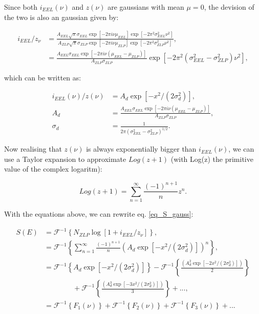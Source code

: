 Since both $i_{EEL}(\nu)$ and $z(\nu)$ are gaussians with mean $\mu = 0$, the devision of the two is also an gaussian given by:

\begin{equation}
\begin{aligned}
i_{EEL}/z_{\nu} &= \frac{A_{EEL} \sqrt{\pi}\sigma_{EEL} \exp{\left[-2 \pi i \nu \mu_{EEL}\right]} \exp{\left[-2 \pi^{2} \sigma_{EEL}^{2} \nu^{2}\right]}}{A_{ZLP} \sqrt{\pi}\sigma_{ZLP} \exp{\left[-2 \pi i \nu \mu_{ZLP}\right]} \exp{\left[-2 \pi^{2} \sigma_{ZLP}^{2} \nu^{2}\right]}} ,\\
&= \frac{A_{EEL} \sigma_{EEL} \exp{\left[-2 \pi i \nu (\mu_{EEL} - \mu_{ZLP})\right]}}{A_{ZLP} \sigma_{ZLP}} \exp{\left[-2 \pi^{2} (\sigma_{EEL}^{2} - \sigma_{ZLP}^{2}) \nu^{2}\right]},
\end{aligned}
\end{equation}

which can be written as:

\begin{equation}\label{eq_gauss_conv}
\begin{aligned}
i_{EEL}(\nu)/z(\nu) &= A_d \exp{[-x^2/(2\sigma_d^2)]},\\
A_d &= \frac{A_{EEL} \sigma_{EEL} \exp{\left[-2 \pi i \nu (\mu_{EEL} - \mu_{ZLP})\right]}}{A_{ZLP} \sigma_{ZLP}},\\
\sigma_d &= \frac{1}{2\pi(\sigma_{EEL}^2 - \sigma_{ZLP}^2)^{1/2}}.
\end{aligned}
\end{equation}


Now realising that $z(\nu)$ is always exponentially bigger than $i_{EEL}(\nu)$, we can use a Taylor expansion to approximate $Log(z+1)$ (with Log(z) the primitive value of the complex logaritm):

\begin{equation}
Log(z+1) = \sum_{n=1}^\infty \frac{(-1)^{n+1}}{n} z^n.
\end{equation}


With the equations above, we can rewrite eq. \eqref{eq_S_gauss}:

\begin{equation}\label{eq_S_gauss_verder}
\begin{aligned}
S(E) &= \mathcal{F}^{-1}\left\{N_{ZLP}\operatorname{log}\left[1+ i_{EEL}/z_{\nu}\right]\right\},\\
&= \mathcal{F}^{-1}\left\{     \sum_{n=1}^\infty \frac{(-1)^{n+1}}{n} \left(A_d \exp{[-x^2/(2\sigma_d^2)]}\right)^n  \right\},\\
&= \mathcal{F}^{-1}\left\{ A_d \exp{[-x^2/(2\sigma_d^2)]} \right\} - \mathcal{F}^{-1}\left\{ \frac{ \left(A_d^2 \exp{[-2x^2/(2\sigma_d^2)]}\right)}{2} \right\} \\
& \quad \quad \quad \quad+ \mathcal{F}^{-1}\left\{ \frac{ \left(A_d^3 \exp{[-3x^2/(2\sigma_d^2)]}\right)}{3} \right\} +... ,\\
&= \mathcal{F}^{-1}\left\{ F_1(\nu) \right\} + \mathcal{F}^{-1}\left\{ F_2(\nu) \right\} + \mathcal{F}^{-1}\left\{ F_3(\nu) \right\} + ...
\end{aligned}
\end{equation}


